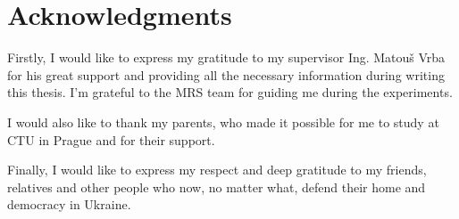 
\section*{Acknowledgments}

Firstly, I would like to express my gratitude to my supervisor Ing. Matouš Vrba for his great support and providing all the necessary information during writing this thesis. I'm grateful to the MRS team for guiding me during the experiments.

I would also like to thank my parents, who made it possible for me to study at CTU in Prague and for their support. 

Finally, I would like to express my respect and deep gratitude to my friends, relatives and other people who now, no matter what, defend their home and democracy in Ukraine.



\vspace{2.5cm}

